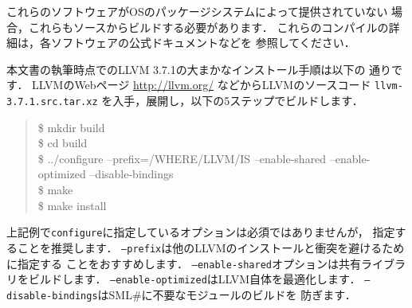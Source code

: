 \documentclass{jbook}
\newcommand{\smlsharp}{SML\#}
\newenvironment{program}{\begin{quote}\begin{tt}}%
                        {\end{tt}\end{quote}}
\begin{document}
	これらのソフトウェアがOSのパッケージシステムによって提供されていない
場合，これらもソースからビルドする必要があります．
	これらのコンパイルの詳細は，各ソフトウェアの公式ドキュメントなどを
参照してください．

	本文書の執筆時点でのLLVM 3.7.1の大まかなインストール手順は以下の
通りです．
	LLVMのWebページ \url{http://llvm.org/} などからLLVMのソースコード
{\tt llvm-3.7.1.src.tar.xz}%
を入手，展開し，以下の5ステップでビルドします．
\begin{program}
\$ mkdir build\\
\$ cd build\\
\$ ../configure --prefix=/WHERE/LLVM/IS --enable-shared --enable-optimized --disable-bindings\\
\$ make\\
\$ make install
\end{program}
	上記例で{\tt configure}に指定しているオプションは必須ではありませんが，
指定することを推奨します．
	{\tt --prefix}は他のLLVMのインストールと衝突を避けるために指定する
ことをおすすめします．
	{\tt --enable-shared}オプションは共有ライブラリをビルドします．
	{\tt --enable-optimized}はLLVM自体を最適化します．
	{\tt --disable-bindings}は\smlsharp{}に不要なモジュールのビルドを
防ぎます．
\end{document}
